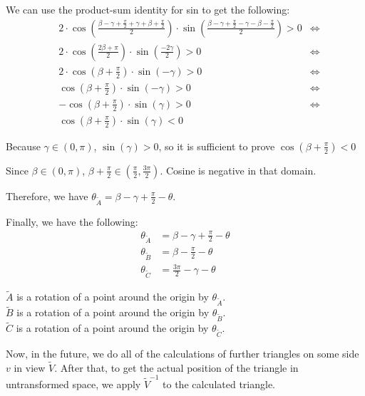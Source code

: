 \documentclass[a4paper,12pt]{article}
\newcommand{\HSview}[1][V]{\widetilde{#1}}
\theoremstyle{definition}
\theoremstyle{plain}
\begin{document}
	We can use the product-sum identity for sin to get the following:
	\begin{align*}
	  & 2 \cdot \cos\left(\frac{\beta - \gamma + \frac{\pi}{2} + \gamma + \beta + \frac{\pi}{2}}{2}\right) \cdot
	    \sin\left(\frac{\beta - \gamma + \frac{\pi}{2} - \gamma - \beta - \frac{\pi}{2}}{2}\right) > 0 & \iff \\
	  & 2 \cdot \cos\left(\frac{2\beta + \pi}{2}\right) \cdot
	    \sin\left(\frac{-2\gamma}{2}\right) > 0 & \iff \\
	  & 2 \cdot \cos\left(\beta + \frac{\pi}{2}\right) \cdot
	    \sin\left(-\gamma\right) > 0 & \iff \\
	  & \cos\left(\beta + \frac{\pi}{2}\right) \cdot
	    \sin\left(-\gamma\right) > 0 & \iff \\
	  & -\cos\left(\beta + \frac{\pi}{2}\right) \cdot
	    \sin\left(\gamma\right) > 0 & \iff \\
	  & \cos\left(\beta + \frac{\pi}{2}\right) \cdot
	    \sin\left(\gamma\right) < 0
	\end{align*}
	
	Because $\gamma \in \left(0, \pi\right)$, $\sin\left(\gamma\right) > 0$, so it is sufficient to prove
	$\cos\left(\beta + \frac{\pi}{2}\right) < 0$

	Since 
	$\beta \in \left(0, \pi\right)$, $\beta + \frac{\pi}{2} \in \left(\frac{\pi}{2}, \frac{3\pi}{2}\right)$.
	Cosine is negative in that domain.


	Therefore, we have $\theta_{\HSview[A]} = \beta - \gamma + \frac{\pi}{2} - \theta$.

	Finally, we have the following:
	\begin{align*}
		\theta_{\HSview[A]} &= \beta - \gamma + \frac{\pi}{2} - \theta \\
		\theta_{\HSview[B]} &= \beta - \frac{\pi}{2} - \theta \\
		\theta_{\HSview[C]} &= \frac{3\pi}{2} - \gamma - \theta
	\end{align*}
	
	$\HSview[A]$ is a rotation of a point around the origin by $\theta_{\HSview[A]}$.\\
	$\HSview[B]$ is a rotation of a point around the origin by $\theta_{\HSview[B]}$.\\
	$\HSview[C]$ is a rotation of a point around the origin by $\theta_{\HSview[C]}$.

	Now, in the future, we do all of the calculations of further triangles on some side $v$ in view $\HSview$.
	After that, to get the actual position of the triangle in untransformed space, we apply $\HSview^{-1}$
	to the calculated triangle.
	
\end{document}
